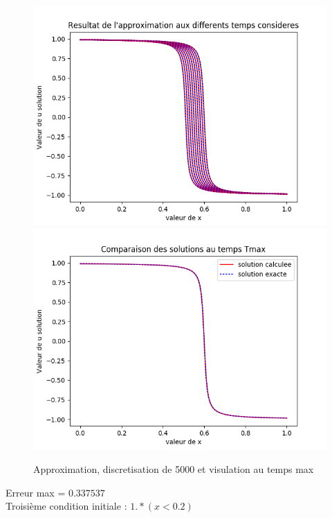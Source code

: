 \documentclass[12pt]{article}
\begin{document}
 \begin{figure}[H]
	\centering
	\includegraphics[scale=0.40]{1D_c1_5000_s1_init2.png}
	\includegraphics[scale=0.40]{Temp_max_c1_5000_s1_i2.png}
	\caption{Approximation, discretisation de 5000 et visulation au temps max}
	\label{1D} 
	\end{figure}
Erreur max = $0.337537$
\\Troisième condition initiale : $1.*(x<0.2)$
\end{document}

